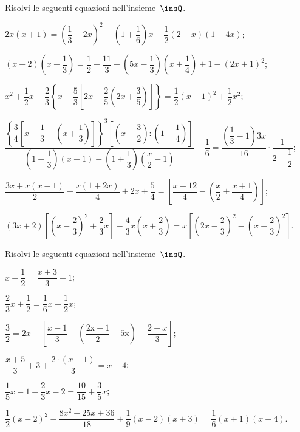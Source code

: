 \begin{esercizio}[\Ast]
\label{ese:15.41}
Risolvi le seguenti equazioni nell'insieme~$\insQ$.
\begin{enumeratea}
 \item $2x(x+1)=\left(\dfrac{1}{3}-2x\right)^{2}-\left(1+\dfrac{1}{6}\right)x-\dfrac{1}{2}(2-x)(1-4x)$;
 \item $(x+2)\left(x-\dfrac{1}{3}\right)=\dfrac{1}{2}+\dfrac{11}{3}+\left(5x-\dfrac{1}{3}\right)\left(x+\dfrac{1}{4}\right)+1-(2x+1)^{2}$;
 \item $x^{2}+\dfrac{1}{2}x+\dfrac{2}{3}\left\lbrace x-\dfrac{5}{3}\left[2x-\dfrac{2}{5}\left(2x+\dfrac{3}{5}\right)\right] \right\rbrace=\dfrac{1}{2}(x-1)^{2}+\dfrac{1}{2}x^{2}$;
 \item $\dfrac{\left\lbrace\dfrac{3}{4}\left[x-\dfrac{1}{3}-\left(x+\dfrac{1}{3}\right)\right]\right\rbrace^{3}\left[\left(x+\dfrac{3}{2}\right):\left(1-\dfrac{1}{4}\right)\right]}{\left(1-\dfrac{1}{3}\right)(x+1)-\left(1+\dfrac{1}{3}\right)\left(\dfrac{x}{2}-1\right)}-\dfrac{1}{6}=\dfrac{\left(\dfrac{1}{3}-1\right)3x}{16}\cdot\dfrac{1}{2-\dfrac{1}{2}}$;
 \item $\dfrac{3x+x(x-1)}{2}-\dfrac{x(1+2x)}{4}+2x+\dfrac{5}{4}=\left[\dfrac{x+12}{4}-\left(\dfrac{x}{2}+\dfrac{x+1}{4}\right)\right]$;
 \item $(3x+2)\left[\left(x-\dfrac{2}{3}\right)^{2}+\dfrac{2}{3}x\right]-\dfrac{4}{3}x\left(x+\dfrac{2}{3}\right)=x\left[\left(2x-\dfrac{2}{3}\right)^{2}-\left(x-\dfrac{2}{3}\right)^{2}\right]$.
\end{enumeratea}
\end{esercizio}

\begin{esercizio}
\label{ese:15.42}
Risolvi le seguenti equazioni nell'insieme~$\insQ$.
\begin{enumeratea}
 \item $x+\dfrac{1}{2}=\dfrac{x+3}{3}-1$;
 \item $\dfrac{2}{3}x+\dfrac{1}{2}=\dfrac{1}{6}x+\dfrac{1}{2}x$;
 \item $\dfrac{3}{2}=2x-\left[\dfrac{x-1}{3}-\left(\dfrac{\text{2x}+1}{2}-\text{5x}\right)-\dfrac{2-x}{3}\right]$;
 \item $\dfrac{x+5}{3}+3+\dfrac{2\cdot \left(x-1\right)}{3}=x+4$;
 \item $\dfrac{1}{5}x-1+\dfrac{2}{3}x-2=\dfrac{10}{15}+\dfrac{3}{5}x$;
 \item $\dfrac{1}{2}(x-2)^{2}-\dfrac{8x^{2}-25x+36}{18}+\dfrac{1}{9}(x-2)(x+3)=\dfrac{1}{6}(x+1)(x-4)$.
\end{enumeratea}
\end{esercizio}

